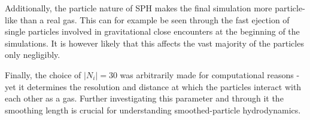\documentclass[../main.tex]{subfiles}
\begin{document}
Additionally, the particle nature of SPH makes the final simulation more particle-like than a real
gas. This can for example be seen through the fast ejection of single particles involved in
gravitational close encounters at the beginning of the simulations. It is however likely that this
affects the vast majority of the particles only negligibly.

Finally, the choice of $|N_i| = 30$ was arbitrarily made for computational reasons - yet it
determines the resolution and distance at which the particles interact with each other as a gas.
Further investigating this parameter and through it the smoothing length is crucial for
understanding smoothed-particle hydrodynamics.
\end{document}

